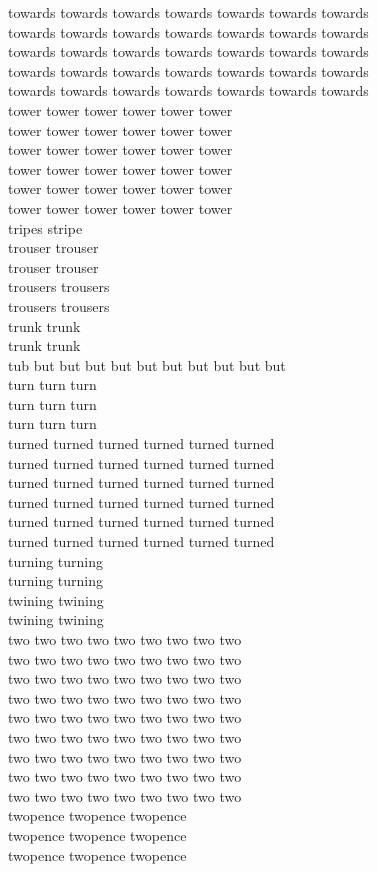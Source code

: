 towards towards towards towards towards towards towards\\
towards towards towards towards towards towards towards\\
towards towards towards towards towards towards towards\\
towards towards towards towards towards towards towards\\
towards towards towards towards towards towards towards\\
tower tower tower tower tower tower\\
tower tower tower tower tower tower\\
tower tower tower tower tower tower\\
tower tower tower tower tower tower\\
tower tower tower tower tower tower\\
tower tower tower tower tower tower\\
tripes stripe\\
trouser trouser\\
trouser trouser\\
trousers trousers\\
trousers trousers\\
trunk trunk\\
trunk trunk\\
tub but but but but but but but but but but\\
turn turn turn\\
turn turn turn\\
turn turn turn\\
turned turned turned turned turned turned\\
turned turned turned turned turned turned\\
turned turned turned turned turned turned\\
turned turned turned turned turned turned\\
turned turned turned turned turned turned\\
turned turned turned turned turned turned\\
turning turning\\
turning turning\\
twining twining\\
twining twining\\
two two two two two two two two two\\
two two two two two two two two two\\
two two two two two two two two two\\
two two two two two two two two two\\
two two two two two two two two two\\
two two two two two two two two two\\
two two two two two two two two two\\
two two two two two two two two two\\
two two two two two two two two two\\
twopence twopence twopence\\
twopence twopence twopence\\
twopence twopence twopence\\


